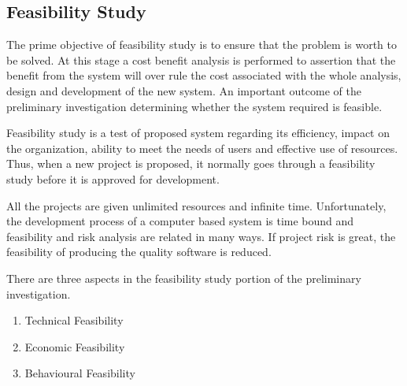 \documentclass[a4paper,12pt]{article}
\begin{document}
\subsection{Feasibility Study}\vspace{5mm}
             The prime objective of feasibility study is to ensure that the problem is worth to be solved. At this stage a cost benefit analysis is performed to assertion that the benefit from the system will over rule the cost associated with the whole analysis, design and development of the new system. An important outcome of the preliminary investigation determining whether the system required is feasible.\par\vspace{2mm}
 Feasibility study is a test of proposed system regarding its efficiency, impact on the organization, ability to meet the needs of users and effective use of resources. Thus, when a new project is proposed, it normally goes through a feasibility study before it is approved for development.\par\vspace{2mm}
            All the projects are given unlimited resources and infinite time. Unfortunately, the development process of a computer based system is time bound and feasibility and risk analysis are related in many ways. If project risk is great, the feasibility of producing the quality software is reduced. \par\vspace{2mm}
There are three aspects in the feasibility study portion of the preliminary investigation.
\begin{enumerate}
\item Technical Feasibility 
\item Economic Feasibility
\item Behavioural Feasibility
\end{enumerate}\vspace{2mm}
\newpage
\end{document}
